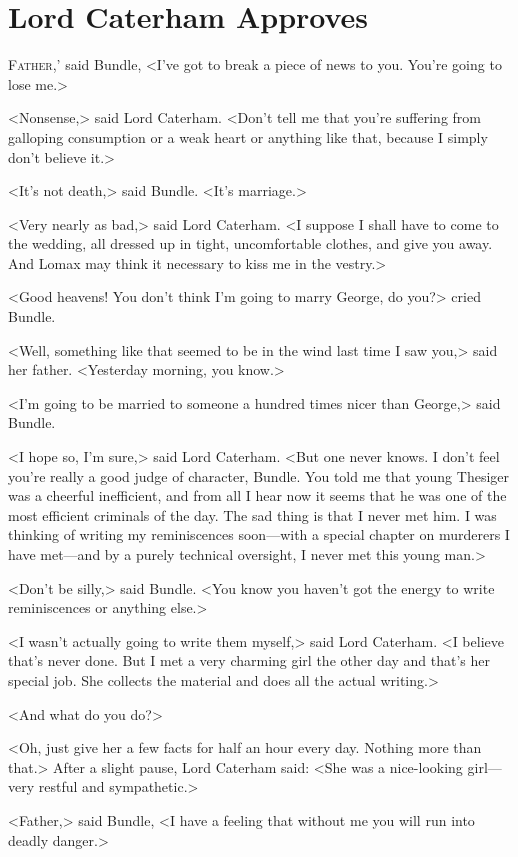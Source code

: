 \chapter{Lord Caterham Approves}

\lettrine[ante=`]{F}{ather,}' said Bundle, <I've got to break a piece of news to you. You're going to lose me.>

\zz
<Nonsense,> said Lord Caterham. <Don't tell me that you're suffering from galloping consumption or a weak heart or anything like that, because I simply don't believe it.>

<It's not death,> said Bundle. <It's marriage.>

<Very nearly as bad,> said Lord Caterham. <I suppose I shall have to come to the wedding, all dressed up in tight, uncomfortable clothes, and give you away. And Lomax may think it necessary to kiss me in the vestry.>

<Good heavens! You don't think I'm going to marry George, do you?> cried Bundle.

<Well, something like that seemed to be in the wind last time I saw you,> said her father. <Yesterday morning, you know.>

<I'm going to be married to someone a hundred times nicer than George,> said Bundle.

<I hope so, I'm sure,> said Lord Caterham. <But one never knows. I don't feel you're really a good judge of character, Bundle. You told me that young Thesiger was a cheerful inefficient, and from all I hear now it seems that he was one of the most efficient criminals of the day. The sad thing is that I never met him. I was thinking of writing my reminiscences soon—with a special chapter on murderers I have met—and by a purely technical oversight, I never met this young man.>

<Don't be silly,> said Bundle. <You know you haven't got the energy to write reminiscences or anything else.>

<I wasn't actually going to write them myself,> said Lord Caterham. <I believe that's never done. But I met a very charming girl the other day and that's her special job. She collects the material and does all the actual writing.>

<And what do you do?>

<Oh, just give her a few facts for half an hour every day. Nothing more than that.> After a slight pause, Lord Caterham said: <She was a nice-looking girl—very restful and sympathetic.>

<Father,> said Bundle, <I have a feeling that without me you will run into deadly danger.>

